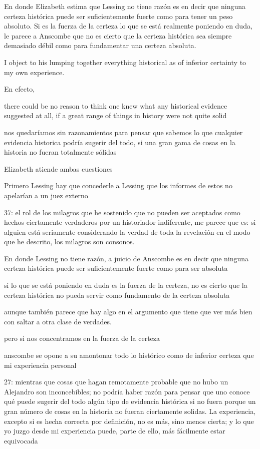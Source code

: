 En donde Elizabeth estima que Lessing no tiene razón es en decir que ninguna
certeza histórica puede ser suficientemente fuerte como para tener un peso
absoluto. Si es la fuerza de la certeza lo que se está realmente poniendo en
duda, le parece a Anscombe que no es cierto que la certeza histórica sea siempre
demasiado débil como para fundamentar una certeza absoluta.

I object to his lumping together everything historical as of inferior certainty
to my own experience.


En efecto,

there could be no reason to think one knew what any historical evidence
suggested at all, if a great range of things in history were not quite solid

nos quedaríamos sin razonamientos para pensar que sabemos lo que cualquier
evidencia historica podría sugerir del todo, si una gran gama de cosas en la
historia no fueran totalmente sólidas

Elizabeth atiende ambas cuestiones

Primero Lessing
hay que concederle a Lessing que los informes de estos no apelarían a un juez
externo


37: el rol de los milagros que he sostenido que no pueden ser aceptados como
hechos ciertamente verdaderos por un historiador indiferente, me parece que es:
si alguien está seriamente considerando la verdad de toda la revelación en el
modo que he descrito, los milagros son consonos.

En donde Lessing no tiene razón, a juicio de Anscombe es en decir que ninguna
certeza histórica puede ser suficientemente fuerte como para ser absoluta

si lo que se está poniendo en duda es la fuerza de la certeza, no es cierto que
la certeza histórica no pueda servir como fundamento de la certeza absoluta

aunque también parece que hay algo en el argumento que tiene que ver más bien
con saltar a otra clase de verdades.

pero si nos concentramos en la fuerza de la certeza

anscombe se opone a su amontonar todo lo histórico como de inferior certeza que
mi experiencia personal

27: mientras que cosas que hagan remotamente probable que no hubo un Alejandro
son inconcebibles; no podría haber razón para pensar que uno conoce qué puede
sugerir del todo algún tipo de evidencia histórica si no fuera porque un gran
número de cosas en la historia no fueran ciertamente solidas. La experiencia,
excepto si es hecha correcta por definición, no es más, sino menos cierta; y lo
que yo juzgo desde mi experiencia puede, parte de ello, más fácilmente estar
equivocada




